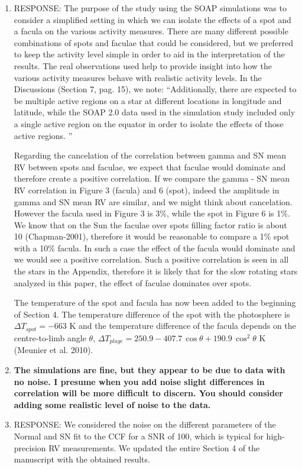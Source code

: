 \documentclass[11pt]{article}   	%
\begin{document}
\begin{enumerate}
\item[]  RESPONSE:  The purpose of the study using the SOAP simulations was to consider a simplified setting in which we can isolate the effects of a spot and a facula on the various activity measures.  There are many different possible combinations of spots and faculae that could be considered, but we preferred to keep the activity level simple in order to aid in the interpretation of the results.  The real observations used help to provide insight into how the various activity measures behave with realistic activity levels. In the Discussions (Section 7, pag. 15), we note: ``Additionally, there are expected to be multiple active regions on a star at different locations in longitude and latitude, while the SOAP 2.0 data used in the simulation study included only a single active region on the equator in order to isolate the effects of those active regions. ''

{\color{red}Regarding the cancelation of the correlation between gamma and SN mean RV between spots and faculae, we expect that faculae would dominate and therefore create a positive correlation. 
If we compare the gamma - SN mean RV correlation in Figure 3 (facula) and 6 (spot), indeed the amplitude in gamma and SN mean RV are similar, and we might think about cancelation. 
However the facula used in Figure 3 is 3\%, while the spot in Figure 6 is 1\%. 
We know that on the Sun the faculae over spots filling factor ratio is about 10 (Chapman-2001), therefore it would be reasonable to compare a 1\% spot with a 10\% facula. In such a case the effect of the facula would dominate and we would see a positive correlation. Such a positive correlation is seen in all the stars in the Appendix, therefore it is likely that for the slow rotating stars analyzed in this paper, the effect of faculae dominates over spots.}

The temperature of the spot and facula has now been added to the beginning of Section 4. The temperature difference of the spot with the photosphere is $\Delta T_{spot} = -663$ K and the temperature difference of the facula depends on the centre-to-limb angle $\theta$,  $\Delta T_{plage} = 250.9 - 407.7\,\cos{\theta} + 190.9\,\cos^2 \theta$ K (Meunier et al. 2010).
\bigskip
%
%
\item {\bf The simulations are fine, but they appear to be due to data with no noise. I presume when you add noise slight differences in correlation will be more difficult to discern. You should consider adding some realistic level of noise to the data.}
%
\item[]  RESPONSE:  We considered the noise on the different parameters of the Normal and SN fit to the CCF for a SNR of 100, which is typical for high-precision RV measurements. We updated the entire Section 4 of the manuscript with the obtained results. 


\end{enumerate}
\end{document}
